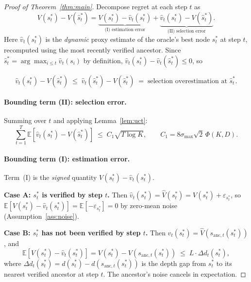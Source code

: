 \begin{proof}[Proof of Theorem~\ref{thm:main}]
Decompose regret at each step $t$ as
\begin{equation}
  V(s^*_t) - V(\hat{s}^*_t)
  = \underbrace{V(s^*_t) - \hat{v}_t(s^*_t)}_{\text{(I) estimation error}}
  + \underbrace{\hat{v}_t(s^*_t) - V(\hat{s}^*_t)}_{\text{(II) selection error}}.
  \label{eq:decomp}
\end{equation}
Here $\hat{v}_t(s^*_t)$ is the \emph{dynamic} proxy estimate of the oracle's best
node $s^*_t$ at step $t$, recomputed using the most recently verified ancestor.
Since $\hat{s}^*_t = \arg\max_{i \leq t} \hat{v}_t(s_i)$ by definition,
$\hat{v}_t(s^*_t) - \hat{v}_t(\hat{s}^*_t) \leq 0$, so

\[
  \hat{v}_t(s^*_t) - V(\hat{s}^*_t)
  \;\leq\; \hat{v}_t(\hat{s}^*_t) - V(\hat{s}^*_t)
  \;=\; \text{selection overestimation at } \hat{s}^*_t.
\]

\paragraph{Bounding term (II): selection error.}
Summing over $t$ and applying Lemma~\ref{lem:uct}:
\[
  \sum_{t=1}^T \mathbb{E}\!\left[\hat{v}_t(s^*_t) - V(\hat{s}^*_t)\right]
  \;\leq\; C_1 \sqrt{T\log K},
  \qquad C_1 = 8\sigma_{\max}\sqrt{2}\,\Phi(K,D).
\]

\paragraph{Bounding term (I): estimation error.}
Term~(I) is the \emph{signed} quantity $V(s^*_t) - \hat{v}_t(s^*_t)$.

\textbf{Case A: $s^*_t$ is verified by step $t$.}
Then $\hat{v}_t(s^*_t) = \hat{V}(s^*_t) = V(s^*_t) + \varepsilon_{s^*_t}$, so
$\mathbb{E}[V(s^*_t) - \hat{v}_t(s^*_t)] = \mathbb{E}[-\varepsilon_{s^*_t}] = 0$
by zero-mean noise (Assumption~\ref{ass:noise}).

\textbf{Case B: $s^*_t$ has not been verified by step $t$.}
Then $\hat{v}_t(s^*_t) = \hat{V}(s_{\mathrm{anc},t}(s^*_t))$, and
\[
  \mathbb{E}[V(s^*_t) - \hat{v}_t(s^*_t)]
  = V(s^*_t) - V(s_{\mathrm{anc},t}(s^*_t))
  \;\leq\; L \cdot \Delta d_t(s^*_t),
\]
where $\Delta d_t(s^*_t) = d(s^*_t) - d(s_{\mathrm{anc},t}(s^*_t))$ is the depth gap
from $s^*_t$ to its nearest verified ancestor at step $t$.  The ancestor's noise
cancels in expectation.


\end{proof}
